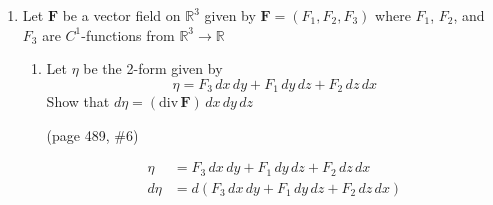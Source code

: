 \documentclass{article}
\newcommand{\divt}{\text{div} \,}
\begin{document}
\thispagestyle{fancy}
\begin{enumerate}
    \item Let $\boldsymbol F$ be a vector field on $\mathbb{R}^3$ given by $\boldsymbol F = (F_1, F_2, F_3)$ where $F_1$, $F_2$, and $F_3$ are $C^1$-functions from $\mathbb{R}^3 \rightarrow \mathbb{R}$
    \begin{enumerate}
        \item Let $\eta$ be the 2-form given by
            \[ \eta = F_3 \, dx \, dy + F_1 \, dy \, dz + F_2 \, dz \, dx \]
            Show that $d\eta = (\divt \boldsymbol F) \, dx \, dy \, dz$
            
            (page 489, \#6)

            \begin{align*} 
                \eta &= F_3 \, dx \, dy + F_1 \, dy \, dz + F_2 \, dz \, dx \\
                d\eta &= d(F_3 \, dx \, dy + F_1 \, dy \, dz + F_2 \, dz \, dx) \\
            \end{align*} 
    \end{enumerate}
\end{enumerate}
\end{document}
